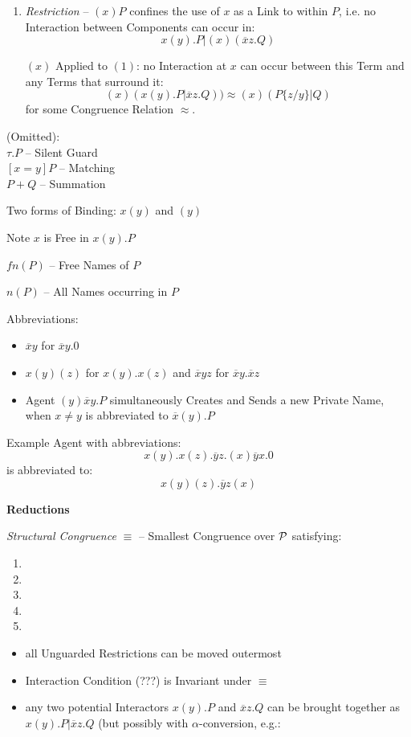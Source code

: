 \begin{enumerate}
  \item \emph{Restriction} -- $(x)P$ confines the use of $x$ as a Link
    to within $P$, i.e. no Interaction between Components can occur
    in:
    \[
      x(y).P | (x)(\overline{x}z.Q)
    \]

    $(x)$ Applied to $(1)$: no Interaction at $x$ can occur between
    this Term and any Terms that surround it:
    \[
      (x)(x(y).P | \overline{x}z.Q)) \approx (x)(P\{z/y\}|Q)
    \]
    for some Congruence Relation $\approx$.

\end{enumerate}

(Omitted): \\
$\tau.P$ -- Silent Guard \\
$[x=y]P$ -- Matching \\
$P + Q$ -- Summation

Two forms of Binding: $x(y)$ and $(y)$

\fist Note $x$ is Free in $x(y).P$

$fn(P)$ -- Free Names of $P$

$n(P)$ -- All Names occurring in $P$

Abbreviations:
\begin{itemize}
  \item $\overline{x}y$ for $\overline{x}y.0$
  \item $x(y)(z)$ for $x(y).x(z)$ and $\overline{x}yz$ for
    $\overline{x}y.\overline{x}z$
  \item Agent $(y)\overline{x}y.P$ simultaneously Creates and Sends a
    new Private Name, when $x \neq y$ is abbreviated to
    $\overline{x}(y).P$
\end{itemize}

Example Agent with abbreviations:
\[
  x(y).x(z).\overline{y}z.(x)\overline{y}x.0
\]
is abbreviated to:
\[
  x(y)(z).\overline{y}z(x)
\]


\textbf{Reductions}

\emph{Structural Congruence} $\equiv$ -- Smallest Congruence over
$\mathcal{P}$ satisfying:
\begin{enumerate}
  \item
  \item
  \item
  \item
  \item
\end{enumerate}

\begin{itemize}
  \item all Unguarded Restrictions can be moved outermost
  \item Interaction Condition (???) is Invariant under $\equiv$
  \item any two potential Interactors $x(y).P$ and $\overline{x}z.Q$
    can be brought together as $x(y).P | \overline{x}z.Q$ (but
    possibly with $\alpha$-conversion, e.g.:
\end{itemize}

